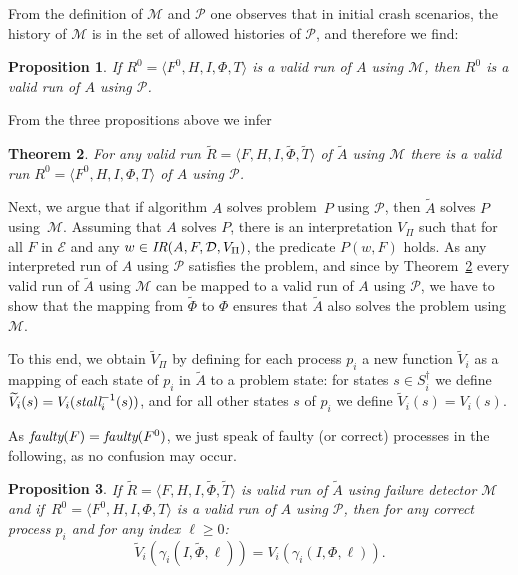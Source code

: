 \documentclass[11pt]{article}
\newtheorem{proposition}{Proposition}[section]
\newtheorem{theorem}[proposition]{Theorem}
\newcommand{\ident}[1]{\textit{#1}\rule{0cm}{1ex}}
\newcommand{\E}{\mathcal{E}}
\newcommand{\D}{\mathcal{D}}
\newcommand{\PFD}{\ensuremath{\mathcal{P}}}
\newcommand{\MFD}{\ensuremath{\mathcal{M}}}
\newcommand{\problem}{P} \newcommand{\Alg}{A}
\newcommand{\TrAlg}{\widetilde{A}}
\begin{document}
From the definition of $\MFD$ and $\PFD$ one observes that in initial
     crash scenarios, the history of $\MFD$ is in the set of allowed
     histories of $\PFD$, and therefore we find: 

\begin{proposition}\label{prop:R0validPFDrun}
If $R^0=\langle F^0, H, I, \Phi, T \rangle$ is a valid run of $\Alg$
     using $\MFD$, then $R^0$ is a valid run of $\Alg$ using $\PFD$.
\end{proposition}

From the three propositions above we infer

\begin{theorem}\label{thm:MPcorr}
For any valid run $\widetilde{R}=\langle F, H, I, \widetilde{\Phi},
     \widetilde{T} \rangle$ of $\TrAlg$ using $\MFD$ there is a valid
     run $R^0=\langle F^0, H, I, \Phi, T \rangle$ of $\Alg$ using
     $\PFD$.
\end{theorem}


Next, we argue that if algorithm $\Alg$ solves problem~$\problem$
     using $\PFD$, then $\TrAlg$ solves $\problem$ using~$\MFD$.
Assuming that $\Alg$ solves $\problem$,  there is an interpretation
     $V_\Pi$ such that for all $F$ in $\E$ and any $w \in
     \ident{IR}(\Alg,F,\D,V_\Pi)$,  the predicate $P(w,F)$ holds.
As any interpreted run of $\Alg$ using $\PFD$ satisfies the problem,
     and since by Theorem~\ref{thm:MPcorr} every valid run of $\TrAlg$
     using $\MFD$ can be mapped to a valid run of  $\Alg$ using
     $\PFD$, we have to show that the mapping from $\widetilde{\Phi}$
     to $\Phi$ ensures that $\TrAlg$ also solves the problem using
     $\MFD$.


To this end, we obtain $\widetilde{V}_\Pi$ by defining for each
     process $p_i$ a new function $\widetilde{V}_i$ as a mapping of
     each state of $p_i$ in $\TrAlg$ to a problem state: for states $s
     \in S^\dagger_i$ we define $\widetilde{V}_i(s) =
     V_i(\ident{stall}_{i}^{-1}(s))$, and for all other states $s$ of
     $p_i$ we define $\widetilde{V}_i(s) = V_i(s)$.

As $\ident{faulty}(F) = \ident{faulty}(F^0)$, we just speak of faulty
     (or correct) processes in the following, as no confusion may
     occur.

\begin{proposition}\label{prop:correctProcessSameVi}
If $\widetilde{R}=\langle F, H, I, \widetilde{\Phi}, \widetilde{T}
     \rangle$  is valid run of $\TrAlg$ using failure detector $\MFD$
     and if~$R^0=\langle F^0, H, I, \Phi, T \rangle$ is a valid run of
     $A$ using $\PFD$, then for any correct process $p_i$ and for any
     index $\ell \ge 0$: 
$$
\widetilde{V}_i(\gamma_i(I,\widetilde{\Phi},\ell)) =
V_i(\gamma_i(I,\Phi,\ell)).
$$
\end{proposition}
\end{document}
